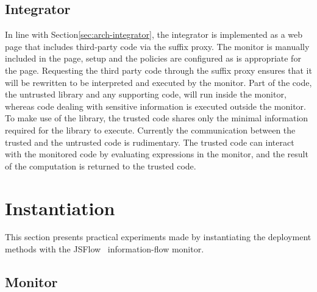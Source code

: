 \documentclass{llncs}
\begin{document}
\subsection{Integrator}


In line with Section\ref{sec:arch-integrator}, the integrator is implemented as 
a web page that includes third-party code via the suffix proxy. The monitor is 
manually included in the page, setup and the policies are configured as is 
appropriate for the page. Requesting the third party code through the suffix 
proxy ensures that it will be rewritten to be interpreted and executed by the 
monitor.
%
Part of the code, the untrusted library and any supporting code,
will run inside the monitor, whereas code dealing with sensitive 
information is executed outside the monitor. To make use of the library, 
the trusted code shares only the minimal information required for the 
library to execute. Currently the communication between the trusted and the 
untrusted code is rudimentary. The trusted code can interact with the monitored 
code by evaluating expressions in the monitor, and the result of the computation
is returned to the trusted code.






\section{Instantiation}
\label{sec:case}

This section presents practical experiments made by instantiating the deployment
methods with the JSFlow~\cite{Hedin:Sabelfeld:CSF12,JSFlow} information-flow monitor. 

\subsection{Monitor}
\end{document}
